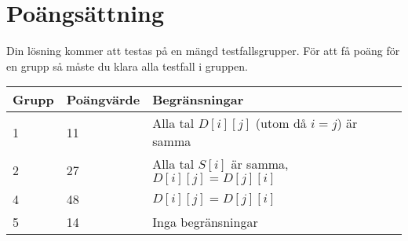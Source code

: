 \section*{Poängsättning}
Din lösning kommer att testas på en mängd testfallsgrupper. För att få poäng för en grupp
så måste du klara alla testfall i gruppen.

\noindent
\begin{tabular}{| l | l | l | l |}
\hline
Grupp & Poängvärde & Begränsningar \\ \hline
1     & 11         & Alla tal $D[i][j]$ (utom då $i = j$) är samma \\ \hline
2     & 27         & Alla tal $S[i]$ är samma, $D[i][j] = D[j][i]$\\ \hline
4     & 48         & $D[i][j] = D[j][i]$ \\ \hline
5     & 14         & Inga begränsningar \\ \hline
\end{tabular}
